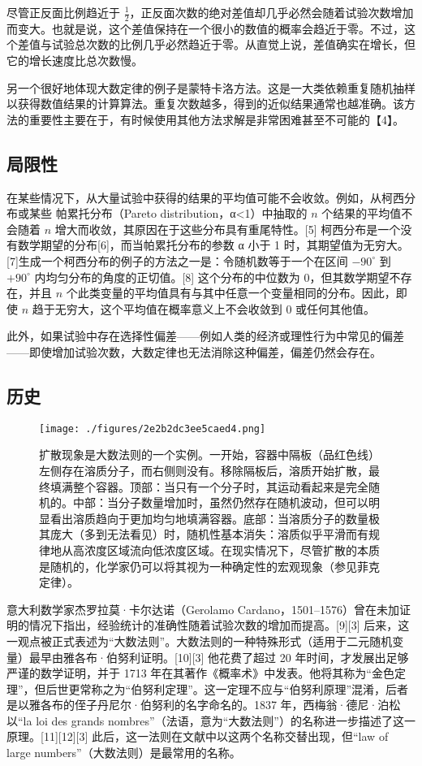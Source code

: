尽管正反面比例趋近于 $\frac{1}{2}$，正反面次数的绝对差值却几乎必然会随着试验次数增加而变大。也就是说，这个差值保持在一个很小的数值的概率会趋近于零。不过，这个差值与试验总次数的比例几乎必然趋近于零。从直觉上说，差值确实在增长，但它的增长速度比总次数慢。

另一个很好地体现大数定律的例子是蒙特卡洛方法。这是一大类依赖重复随机抽样以获得数值结果的计算算法。重复次数越多，得到的近似结果通常也越准确。该方法的重要性主要在于，有时候使用其他方法求解是非常困难甚至不可能的【4】。
\subsection{局限性}
在某些情况下，从大量试验中获得的结果的平均值可能不会收敛。例如，从柯西分布或某些 帕累托分布（Pareto distribution，α<1）中抽取的 $n$ 个结果的平均值不会随着 $n$ 增大而收敛，其原因在于这些分布具有重尾特性。[5] 柯西分布是一个没有数学期望的分布[6]，而当帕累托分布的参数 α 小于 1 时，其期望值为无穷大。[7]生成一个柯西分布的例子的方法之一是：令随机数等于一个在区间 $-90^\circ$ 到 $+90^\circ$ 内均匀分布的角度的正切值。[8] 这个分布的中位数为 0，但其数学期望不存在，并且 $n$ 个此类变量的平均值具有与其中任意一个变量相同的分布。因此，即使 $n$ 趋于无穷大，这个平均值在概率意义上不会收敛到 0 或任何其他值。

此外，如果试验中存在选择性偏差——例如人类的经济或理性行为中常见的偏差——即使增加试验次数，大数定律也无法消除这种偏差，偏差仍然会存在。
\subsection{历史}
\begin{figure}[ht]
\centering
\texttt{[image: ./figures/2e2b2dc3ee5caed4.png]}
\caption{扩散现象是大数法则的一个实例。一开始，容器中隔板（品红色线）左侧存在溶质分子，而右侧则没有。移除隔板后，溶质开始扩散，最终填满整个容器。顶部：当只有一个分子时，其运动看起来是完全随机的。中部：当分子数量增加时，虽然仍然存在随机波动，但可以明显看出溶质趋向于更加均匀地填满容器。底部：当溶质分子的数量极其庞大（多到无法看见）时，随机性基本消失：溶质似乎平滑而有规律地从高浓度区域流向低浓度区域。在现实情况下，尽管扩散的本质是随机的，化学家仍可以将其视为一种确定性的宏观现象（参见菲克定律）。} \label{fig_DSdl_3}
\end{figure}
意大利数学家杰罗拉莫·卡尔达诺（Gerolamo Cardano，1501–1576）曾在未加证明的情况下指出，经验统计的准确性随着试验次数的增加而提高。[9][3] 后来，这一观点被正式表述为“大数法则”。大数法则的一种特殊形式（适用于二元随机变量）最早由雅各布·伯努利证明。[10][3] 他花费了超过 20 年时间，才发展出足够严谨的数学证明，并于 1713 年在其著作《概率术》中发表。他将其称为“金色定理”，但后世更常称之为“伯努利定理”。这一定理不应与“伯努利原理”混淆，后者是以雅各布的侄子丹尼尔·伯努利的名字命名的。1837 年，西梅翁·德尼·泊松以“la loi des grands nombres”（法语，意为“大数法则”）的名称进一步描述了这一原理。[11][12][3] 此后，这一法则在文献中以这两个名称交替出现，但“law of large numbers”（大数法则）是最常用的名称。

